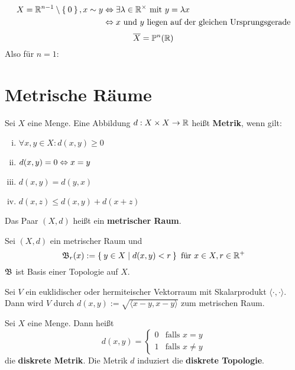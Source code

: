 \begin{beispiel}
    \begin{align*}
        X= \mathbb{R}^{n-1} \setminus \Set{0}, x \sim y &\Leftrightarrow \exists \lambda \in \mathbb{R}^\times \text{ mit } y = \lambda x\\
            &\Leftrightarrow x \text{ und } y \text{ liegen auf der gleichen Ursprungsgerade}
    \end{align*}
    \[\overline{X} = \mathbb{P}^n(\mathbb{R})\]
    Also für $n=1$:\nopagebreak\\
    
\end{beispiel}

\section{Metrische Räume}
\begin{definition}  
    Sei $X$ eine Menge. Eine Abbildung $d:X\times X \rightarrow \mathbb{R}$
    heißt \textbf{Metrik}, wenn gilt:
    \begin{enumerate}[(i)]
        \item $\forall x, y \in X: d(x,y) \geq 0$
        \item $d(x,y) = 0 \Leftrightarrow x = y$
        \item $d(x,y) = d(y,x)$
        \item $d(x,z) \leq d(x,y) + d(x+z)$
    \end{enumerate}

    Das Paar $(X, d)$ heißt ein \textbf{metrischer Raum}.
\end{definition}

\begin{bemerkung}
    Sei $(X, d)$ ein metrischer Raum und
    \[\mathfrak{B}_r(x) := \Set{y \in X | d(x,y) < r} \text{ für } x \in X, r \in \mathbb{R}^+\]
    $\mathfrak{B}$ ist Basis einer Topologie auf $X$.
\end{bemerkung}

\begin{beispiel}
    Sei $V$ ein euklidischer oder hermiteischer Vektorraum mit Skalarprodukt
    $\langle \cdot , \cdot \rangle$.
    Dann wird $V$ durch $d(x,y) := \sqrt{\langle x-y, x-y \rangle}$ zum metrischen Raum.
\end{beispiel}

\begin{beispiel}  
    Sei $X$ eine Menge. Dann heißt
    \[d(x,y) = \begin{cases}
    0 & \text{falls } x=y\\
    1 & \text{falls } x \neq y
    \end{cases}\]
    die \textbf{diskrete Metrik}. Die Metrik $d$ induziert die 
    \textbf{diskrete Topologie}.
\end{beispiel}

